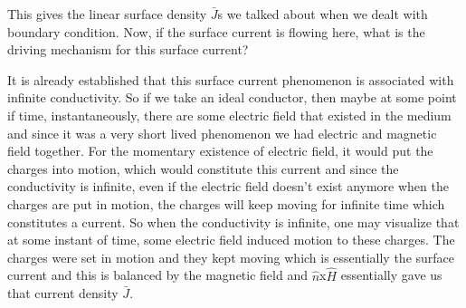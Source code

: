 This gives the linear surface density $\bar{J}$s we talked about when we dealt with boundary condition. Now, if the surface current is flowing here, what is the driving mechanism for this surface current?

It is already established that this surface current phenomenon is associated with infinite conductivity. So if we take an ideal conductor, then maybe at some point if time, instantaneously, there are some electric field that existed in the medium and since it was a very short lived phenomenon we had electric and magnetic field together.
For the momentary existence of electric field, it would put the charges into motion, which would constitute this current and since the conductivity is infinite, even if the electric field doesn't exist anymore when the charges are put in motion, the charges will keep moving for infinite time which constitutes a current. So when the conductivity is infinite, one may visualize that at some instant of time, some electric field induced motion to these charges. The charges were set in motion and they kept moving which is essentially the surface current and this is balanced by the magnetic field and $\hat{n}$x$\hat{H}$ essentially gave us that current density $\bar{J}$.

